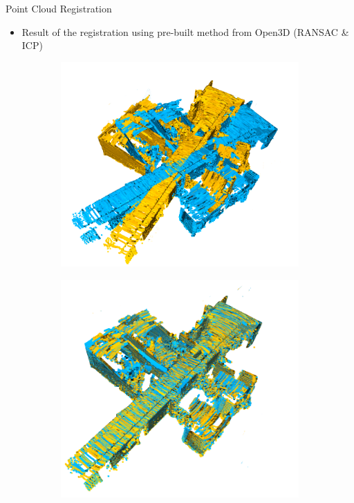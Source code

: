 \documentclass{beamer}
\begin{document}
\begin{frame}{Point Cloud Registration}
    \begin{itemize}
        \item Result of the registration using pre-built method from Open3D (RANSAC \& ICP) 
    \end{itemize}
    
    \begin{figure}
        \begin{subfigure}{.48\linewidth}
        \centering
        \includegraphics[scale=0.15]{img/06_ICP0.png}
        \end{subfigure}
        \begin{subfigure}{.48\linewidth}
        \centering
        \includegraphics[scale=0.16]{img/06_ICP1.png}
        \end{subfigure}\\
    \end{figure}
\end{frame}
\end{document}
